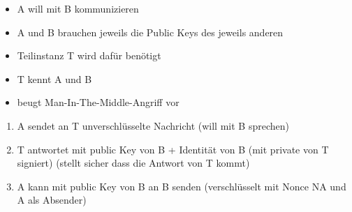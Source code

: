 \documentclass{scrartcl}
\begin{document}
\begin{itemize} {Assymmetrisch}
  \item A will mit B kommunizieren
  \item A und B brauchen jeweils die Public Keys des jeweils anderen
  \item Teilinstanz T wird dafür benötigt
  \item T kennt A und B
  \item beugt Man-In-The-Middle-Angriff vor
\end{itemize}

\begin{enumerate}
  \item A sendet an T unverschlüsselte Nachricht (will mit B sprechen)
  \item T antwortet mit public Key von B + Identität von B (mit private von T
    signiert) (stellt sicher dass die Antwort von T kommt)
  \item A kann mit public Key von B an B senden (verschlüsselt mit Nonce NA und
    A als Absender)
\end{enumerate}
\end{document}
